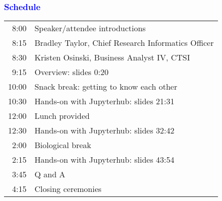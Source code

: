 \documentclass[11pt,pdftex,dvipsnames,usenames]{beamer}
\begin{document}
\begin{frame}[fragile]\frametitle{\bf\textcolor{blue}{Schedule}}

\begin{tabular}{rl}
8:00 & Speaker/attendee introductions \\
8:15 & Bradley Taylor, Chief Research Informatics Officer \\
8:30 & Kristen Osinski, Business Analyst IV, CTSI \\
9:15 & Overview: slides 0:20  \\
10:00& Snack break: getting to know each other \\
10:30& Hands-on with Jupyterhub: slides 21:31  \\
12:00& Lunch provided \\
12:30& Hands-on with Jupyterhub: slides 32:42  \\
2:00 & Biological break \\
2:15 & Hands-on with Jupyterhub: slides 43:54 \\
3:45 & Q and A \\
4:15 & Closing ceremonies
\end{tabular}

\end{frame}

\begin{comment}
\begin{frame}[fragile]\frametitle{\bf\textcolor{blue}{Outline}}

\begin{itemize}
\item Overview
\item Background
\item Timeline
\end{itemize}

\end{frame}
\end{comment}
\end{document}
